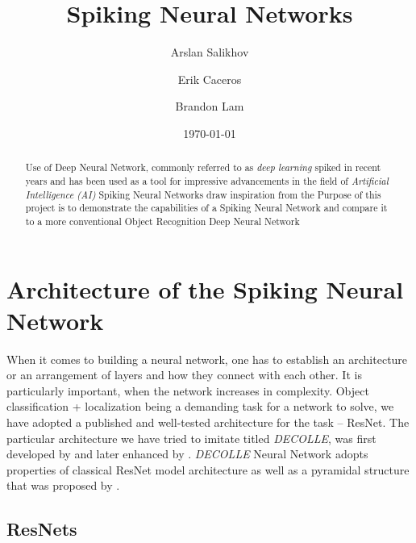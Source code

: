 \documentclass{article}
\title{Spiking Neural Networks}
\author{Arslan Salikhov \\
	\and 
	Erik Caceros \\
	\and
	Brandon Lam \\
	}
\date{\today}
\begin{document}
\begin{titlingpage}
\maketitle
\begin{abstract}
	Use of Deep Neural Network, commonly referred to as
	\emph{deep learning} spiked in recent years and has been used
	as a tool for impressive advancements in the field of 
	\emph{Artificial Intelligence (AI)}
	Spiking Neural Networks draw inspiration from the 
	Purpose of this project is to demonstrate the capabilities of a 
	Spiking Neural Network and compare it to a more conventional 
	Object Recognition Deep Neural Network
	\end{abstract}
\end{titlingpage}


\tableofcontents
\newpage




\section{Architecture of the Spiking Neural Network}

When it comes to building a neural network, one has to establish an
architecture or an arrangement of layers and how they connect with each other.
It is particularly important, when the network increases in complexity. Object
classification + localization being a demanding task for a network to solve,
we have adopted a published and well-tested architecture for the task --
ResNet. The particular architecture we have tried to imitate titled 
\textit{DECOLLE}, was first developed by  and later
enhanced by . \textit{DECOLLE} Neural Network adopts 
properties of classical ResNet model architecture as well as a pyramidal structure that
was proposed by . 

\subsection{ResNets}
\end{document}
